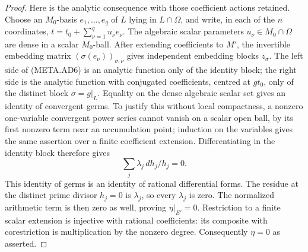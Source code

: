 \begin{proof}
Here is the analytic consequence with those coefficient
actions retained.  Choose an $M_0$-basis $e_1,\ldots,e_q$
of $L$ lying in $L\cap\Omega$, and write, in each of the
$n$ coordinates,
$t=t_0+\sum_{\nu=1}^q u_\nu e_\nu$.
The algebraic scalar parameters $u_\nu\in M_0\cap\Omega$
are dense in a scalar $M_0$-ball.
After extending coefficients to $M'$, the invertible
embedding matrix $(\sigma(e_\nu))_{\sigma,\nu}$ gives
independent embedding blocks $z_\sigma$.
The left side of (META.AD6) is an analytic function
only of the identity block; the right side is the
analytic function with conjugated coefficients, centred
at $g t_0$, only of the distinct block $\sigma=g|_L$.
Equality on the dense algebraic scalar set gives an
identity of convergent germs.  To justify this without
local compactness, a nonzero one-variable convergent
power series cannot vanish on a scalar open ball, by
its first nonzero term near an accumulation point;
induction on the variables gives the same assertion
over a finite coefficient extension.
Differentiating in the identity block therefore gives
\[
                         \sum_j\lambda_j\,dh_j/h_j=0.
                                                               \tag{META.AD7}
\]
This identity of germs is an identity of rational
differential forms.  The residue at the distinct prime
divisor $h_j=0$ is $\lambda_j$, so every $\lambda_j$ is
zero.  The normalized arithmetic term is then zero as
well, proving $\eta|_{E'}=0$.
Restriction to a finite scalar extension is injective
with rational coefficients: its composite with
corestriction is multiplication by the nonzero degree.
Consequently $\eta=0$ as asserted.
\end{proof}

